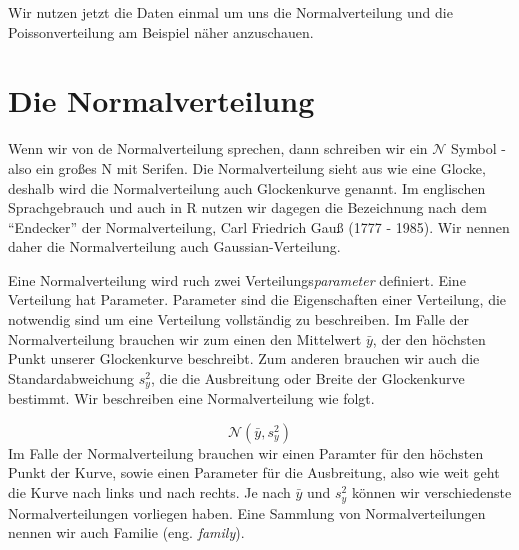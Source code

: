 \documentclass[
  letterpaper,
]{scrbook}
\begin{document}
Wir nutzen jetzt die Daten einmal um uns die Normalverteilung und die
Poissonverteilung am Beispiel näher anzuschauen.

\hypertarget{sec-normal}{%
\section{Die Normalverteilung}\label{sec-normal}}

{}

Wenn wir von de Normalverteilung sprechen, dann schreiben wir ein
\(\mathcal{N}\) Symbol - also ein großes N mit Serifen. Die
Normalverteilung sieht aus wie eine Glocke, deshalb wird die
Normalverteilung auch Glockenkurve genannt. Im englischen Sprachgebrauch
und auch in R nutzen wir dagegen die Bezeichnung nach dem ``Endecker''
der Normalverteilung, Carl Friedrich Gauß (1777 - 1985). Wir nennen
daher die Normalverteilung auch Gaussian-Verteilung.

{}

Eine Normalverteilung wird ruch zwei Verteilungs\emph{parameter}
definiert. Eine Verteilung hat Parameter. Parameter sind die
Eigenschaften einer Verteilung, die notwendig sind um eine Verteilung
vollständig zu beschreiben. Im Falle der Normalverteilung brauchen wir
zum einen den Mittelwert \(\bar{y}\), der den höchsten Punkt unserer
Glockenkurve beschreibt. Zum anderen brauchen wir auch die
Standardabweichung \(s^2_y\), die die Ausbreitung oder Breite der
Glockenkurve bestimmt. Wir beschreiben eine Normalverteilung wie folgt.

\[
\mathcal{N}(\bar{y}, s^2_y)
\] Im Falle der Normalverteilung brauchen wir einen Paramter für den
höchsten Punkt der Kurve, sowie einen Parameter für die Ausbreitung,
also wie weit geht die Kurve nach links und nach rechts. Je nach
\(\bar{y}\) und \(s^2_y\) können wir verschiedenste Normalverteilungen
vorliegen haben. Eine Sammlung von Normalverteilungen nennen wir auch
Familie (eng. \emph{family}).

{}
\end{document}

